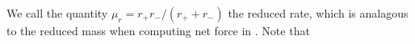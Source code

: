 We call the quantity \(\mu_r = r_+r_-/(r_+ + r_-)\) the reduced rate, which is analagous to the reduced mass when computing net force in .  Note that